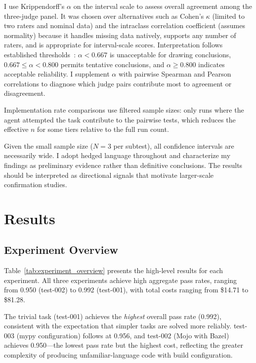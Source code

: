 \documentclass[11pt]{article}
\begin{document}
I use Krippendorff's $\alpha$ on the interval scale to assess overall
agreement among the three-judge panel. It was chosen over alternatives such as
Cohen's $\kappa$ (limited to two raters and nominal data) and the intraclass
correlation coefficient (assumes normality) because it handles missing data
natively, supports any number of raters, and is appropriate for interval-scale
scores. Interpretation follows established thresholds~\cite{krippendorff2004content}:
$\alpha < 0.667$ is unacceptable for drawing conclusions, $0.667 \leq \alpha
< 0.800$ permits tentative conclusions, and $\alpha \geq 0.800$ indicates
acceptable reliability. I supplement $\alpha$ with pairwise Spearman and
Pearson correlations to diagnose which judge pairs contribute most to
agreement or disagreement.

Implementation rate comparisons use filtered sample sizes: only runs where the
agent attempted the task contribute to the pairwise tests, which reduces the
effective $n$ for some tiers relative to the full run count.

Given the small sample size ($N=3$ per subtest), all confidence intervals are
necessarily wide. I adopt hedged language throughout and characterize my
findings as preliminary evidence rather than definitive conclusions. The
results should be interpreted as directional signals that motivate
larger-scale confirmation studies.

\section{Results}
\label{sec:results}

\subsection{Experiment Overview}
\label{sec:experiment_overview}

Table~\ref{tab:experiment_overview} presents the high-level results for each
experiment. All three experiments achieve high aggregate pass rates, ranging
from 0.950 (test-002) to 0.992 (test-001), with total costs ranging from
\$14.71 to \$81.28.



The trivial task (test-001) achieves the \emph{highest} overall pass rate
(0.992), consistent with the expectation that simpler tasks are solved more
reliably. test-003 (mypy configuration) follows at 0.956, and test-002 (Mojo
with Bazel) achieves 0.950---the lowest pass rate but the highest cost,
reflecting the greater complexity of producing unfamiliar-language code with
build configuration.
\end{document}

